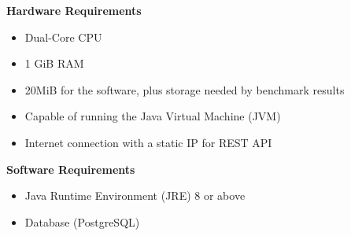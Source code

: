 \textbf{Hardware Requirements}
\begin{itemize}
    \item Dual-Core CPU
    \item 1 GiB RAM
    \item 20MiB for the software, plus storage needed by \glspl{benchmark result}
    \item Capable of running the Java Virtual Machine (JVM)
    \item Internet connection with a static IP for \gls{REST API}
\end{itemize}

\textbf{Software Requirements}
\begin{itemize}
    \item Java Runtime Environment (JRE) 8 or above
    \item Database (PostgreSQL)
\end{itemize}
